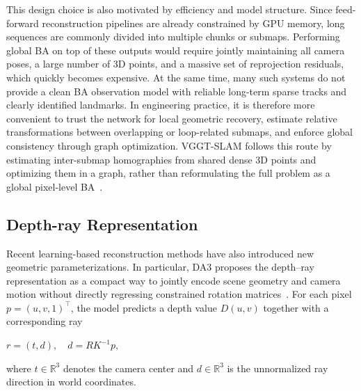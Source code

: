 This design choice is also motivated by efficiency and model structure. Since feed-forward reconstruction pipelines are already constrained by GPU memory, long sequences are commonly divided into multiple chunks or submaps. Performing global BA on top of these outputs would require jointly maintaining all camera poses, a large number of 3D points, and a massive set of reprojection residuals, which quickly becomes expensive. At the same time, many such systems do not provide a clean BA observation model with reliable long-term sparse tracks and clearly identified landmarks. In engineering practice, it is therefore more convenient to trust the network for local geometric recovery, estimate relative transformations between overlapping or loop-related submaps, and enforce global consistency through graph optimization. VGGT-SLAM follows this route by estimating inter-submap homographies from shared dense 3D points and optimizing them in a graph, rather than reformulating the full problem as a global pixel-level BA~\cite{maggio2025vggtslam}.

\subsection{Depth-ray Representation}
\label{sec:depth_ray_representation}
Recent learning-based reconstruction methods have also introduced new geometric parameterizations. In particular, DA3 proposes the depth--ray representation as a compact way to jointly encode scene geometry and camera motion without directly regressing constrained rotation matrices~\cite{lin2025da3}. For each pixel $p=(u,v,1)^\top$, the model predicts a depth value $D(u,v)$ together with a corresponding ray
\begin{center}
    $\displaystyle r=(t,d), \quad d=RK^{-1}p, $
\end{center}
where $t \in \mathbb{R}^3$ denotes the camera center and $d \in \mathbb{R}^3$ is the unnormalized ray direction in world coordinates.

